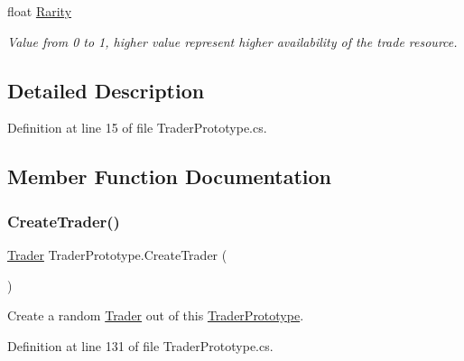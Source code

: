 \begin{DoxyCompactItemize}
\item 
float \hyperlink{class_trader_prototype_a4207b86e570e7237b9df76b91cd0e7e1}{Rarity}
\begin{DoxyCompactList}\small\item\em Value from 0 to 1, higher value represent higher availability of the trade resource. \end{DoxyCompactList}\end{DoxyCompactItemize}


\subsection{Detailed Description}


Definition at line 15 of file Trader\+Prototype.\+cs.



\subsection{Member Function Documentation}
\mbox{\label{class_trader_prototype_a872ada8d81c0b2e7e1fc236447758e3a}} 
\subsubsection{\texorpdfstring{Create\+Trader()}{CreateTrader()}}
{\footnotesize\ttfamily \hyperlink{class_trader}{Trader} Trader\+Prototype.\+Create\+Trader (\begin{DoxyParamCaption}{ }\end{DoxyParamCaption})}



Create a random \hyperlink{class_trader}{Trader} out of this \hyperlink{class_trader_prototype}{Trader\+Prototype}. 



Definition at line 131 of file Trader\+Prototype.\+cs.

\mbox{\label{class_trader_prototype_a0b071be077414f02a1f78b3217743fe6}} 

